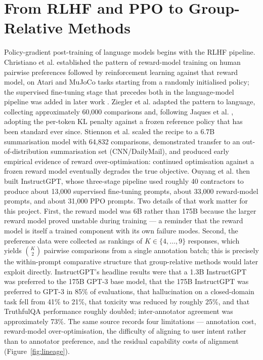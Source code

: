 \documentclass[12pt,a4paper]{report}
\begin{document}
\section{From RLHF and PPO to Group-Relative
Methods}\label{from-rlhf-and-ppo-to-group-relative-methods}

Policy-gradient post-training of language models begins with the RLHF
pipeline. Christiano et al. \citep{christiano2017deeprlhf} established
the pattern of reward-model training on human pairwise preferences
followed by reinforcement learning against that reward model, on Atari
and MuJoCo tasks starting from a randomly initialised policy; the
supervised fine-tuning stage that precedes both in the language-model
pipeline was added in later work
\citep{stiennon2020summarize, ouyang2022instructgpt}. Ziegler et al.
\citep{ziegler2019finetuning} adapted the pattern to language,
collecting approximately 60,000 comparisons and, following Jaques et al.
\citep{jaques2017sequencetutor, jaques2019wayoffpolicy}, adopting the
per-token KL penalty against a frozen reference policy that has been
standard ever since. Stiennon et al. \citep{stiennon2020summarize}
scaled the recipe to a 6.7B summarisation model with 64,832 comparisons,
demonstrated transfer to an out-of-distribution summarisation set
(CNN/DailyMail), and produced early empirical evidence of reward
over-optimisation: continued optimisation against a frozen reward model
eventually degrades the true objective. Ouyang et al.
\citep{ouyang2022instructgpt} then built InstructGPT, whose three-stage
pipeline used roughly 40 contractors to produce about 13,000 supervised
fine-tuning prompts, about 33,000 reward-model prompts, and about 31,000
PPO prompts. Two details of that work matter for this project. First,
the reward model was 6B rather than 175B because the larger reward model
proved unstable during training --- a reminder that the reward model is
itself a trained component with its own failure modes. Second, the
preference data were collected as rankings of \(K \in \{4, \dots, 9\}\)
responses, which yields \(\binom{K}{2}\) pairwise comparisons from a
single annotation batch; this is precisely the within-prompt comparative
structure that group-relative methods would later exploit directly.
InstructGPT's headline results were that a 1.3B InstructGPT was
preferred to the 175B GPT-3 base model, that the 175B InstructGPT was
preferred to GPT-3 in 85\% of evaluations, that hallucination on a
closed-domain task fell from 41\% to 21\%, that toxicity was reduced by
roughly 25\%, and that TruthfulQA performance roughly doubled;
inter-annotator agreement was approximately 73\%. The same source
records four limitations --- annotation cost, reward-model
over-optimisation, the difficulty of aligning to user intent rather than
to annotator preference, and the residual capability costs of alignment (Figure~\ref{fig:lineage}).
\end{document}
